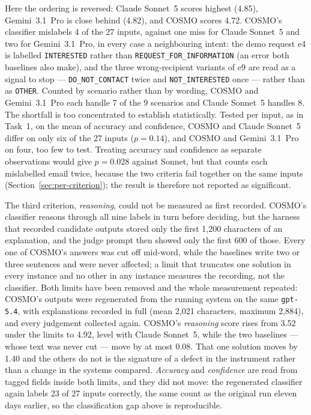 \documentclass[a4paper]{article}
\begin{document}
Here the ordering is reversed: Claude Sonnet~5 scores highest (4.85),
Gemini~3.1~Pro is close behind (4.82), and COSMO scores 4.72. COSMO's
classifier mislabels 4 of the 27 inputs, against one miss for Claude Sonnet~5
and two for Gemini~3.1~Pro, in every case a neighbouring intent: the demo
request e4 is labelled \texttt{INTERESTED} rather than
\texttt{REQUEST\_FOR\_INFORMATION} (an error both baselines also make), and the
three wrong-recipient variants of e9 are read as a signal to stop ---
\texttt{DO\_NOT\_CONTACT} twice and \texttt{NOT\_INTERESTED} once --- rather than
as \texttt{OTHER}. Counted by scenario rather than by wording, COSMO and
Gemini~3.1~Pro each handle 7 of the 9 scenarios and Claude Sonnet~5 handles 8.
The shortfall is too concentrated to establish statistically. Tested per
input, as in Task~1, on the mean of accuracy and confidence, COSMO and Claude
Sonnet~5 differ on only six of the 27 inputs ($p=0.14$), and COSMO and
Gemini~3.1~Pro on four, too few to test. Treating accuracy and confidence as
separate observations would give $p=0.028$ against Sonnet, but that counts each
mislabelled email twice, because the two criteria fail together on the same
inputs (Section~\ref{sec:per-criterion}); the result is therefore not reported
as significant.

The third criterion, \textit{reasoning}, could not be measured as first
recorded. COSMO's classifier reasons through all nine labels in turn before
deciding, but the harness that recorded candidate outputs stored only the first
1,200 characters of an explanation, and the judge prompt then showed only the
first 600 of those. Every one of COSMO's answers was cut off mid-word, while the
baselines write two or three sentences and were never affected; a limit that
truncates one solution in every instance and no other in any instance measures
the recording, not the classifier. Both limits have been removed and the whole
measurement repeated: COSMO's outputs were regenerated from the running system
on the same \texttt{gpt-5.4}, with explanations recorded in full (mean 2,021
characters, maximum 2,884), and every judgement collected again.
COSMO's \textit{reasoning} score rises from 3.52 under the limits to 4.92, level
with Claude Sonnet~5, while the two baselines --- whose text was never cut ---
move by at most 0.08. That one solution moves by 1.40 and the others do not is
the signature of a defect in the instrument rather than a change in the systems
compared. \textit{Accuracy} and \textit{confidence} are read from tagged fields
inside both limits, and they did not move: the regenerated classifier again
labels 23 of 27 inputs correctly, the same count as the original run eleven
days earlier, so the classification gap above is reproducible.
\end{document}
